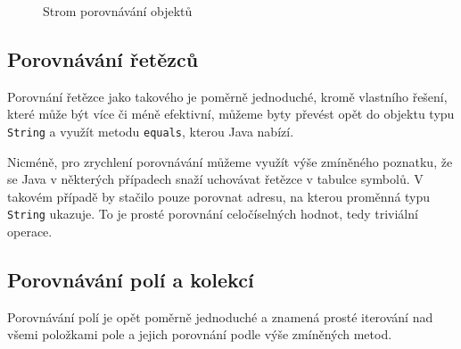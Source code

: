\begin{figure}[ht!]
    \centering
    \caption{Strom porovnávání objektů}
    \label{obr-height}
\end{figure}

\subsection{Porovnávání řetězců}
Porovnání řetězce jako takového je poměrně jednoduché, kromě vlastního řešení, které může být více či méně efektivní, můžeme byty převést opět do objektu typu \texttt{String} a využít metodu \texttt{equals}, kterou Java nabízí.

Nicméně, pro zrychlení porovnávání můžeme využít výše zmíněného poznatku, že se Java v některých případech snaží uchovávat řetězce v tabulce symbolů. V takovém případě by stačilo pouze porovnat adresu, na kterou proměnná typu \texttt{String} ukazuje. To je prosté porovnání celočíselných hodnot, tedy triviální operace.

\subsection{Porovnávání polí a kolekcí}
Porovnávání polí je opět poměrně jednoduché a znamená prosté iterování nad všemi položkami pole a jejich porovnání podle výše zmíněných metod. 

